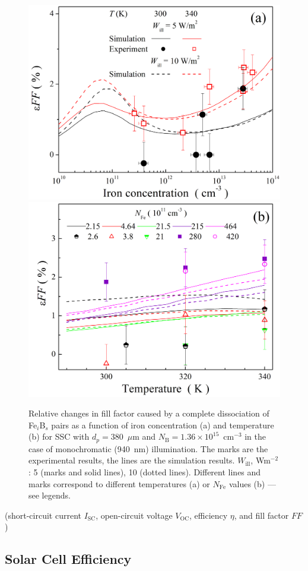 \documentclass[a4paper,fleqn]{cas-sc}
\begin{document}
\begin{figure}
	\centering
     \includegraphics[width=0.4\linewidth]{Fig9a.png}
     \includegraphics[width=0.4\linewidth]{Fig9b.png}
	  \caption{Relative changes in fill factor caused by a complete
       dissociation of Fe$_i$B$_s$ pairs as a function of iron concentration (a) and
       temperature (b) for SSC with $d_p=380$~$\mu$m and $N_\mathrm{B}=1.36\times10^{15}$~cm$^{-3}$
       in the case of monochromatic (940~nm) illumination.
       The marks are the experimental results, the lines are the simulation results.
       $W_\mathrm{ill}$, Wm$^{-2}$: 5 (marks and solid lines), 10 (dotted lines).
       Different lines and marks correspond to different temperatures (a) or $N_\mathrm{Fe}$ values (b) --- see legends.
}\label{fig9}
\end{figure}

(short-circuit current  $I_\mathrm{SC}$,
open-circuit voltage $V_\mathrm{OC}$,
efficiency $\eta$, and fill factor $FF$)

\subsection{Solar Cell Efficiency}
\end{document}
